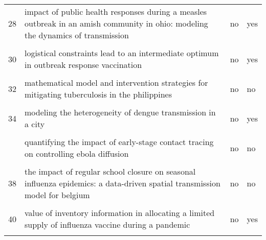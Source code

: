 \documentclass[
]{article}
\begin{document}
\begin{landscape}
\begin{longtable}{l>{\raggedright\arraybackslash}p{4cm}l>{\raggedright\arraybackslash}p{4cm}}
28 & impact of public health responses during a measles outbreak in an amish community in ohio: modeling the dynamics of transmission & no & yes\\
\cellcolor{gray!6}{29} & \cellcolor{gray!6}{initial validation of a simulation model for estimating the impact of serogroup a neisseria meningitidis vaccination in the african meningitis belt} & \cellcolor{gray!6}{no} & \cellcolor{gray!6}{yes}\\
30 & logistical constraints lead to an intermediate optimum in outbreak response vaccination & no & yes\\
\addlinespace
\cellcolor{gray!6}{31} & \cellcolor{gray!6}{manipulation of contact network structure and the impact on foot-and-mouth disease transmission} & \cellcolor{gray!6}{no} & \cellcolor{gray!6}{no}\\
32 & mathematical model and intervention strategies for mitigating tuberculosis in the philippines & no & no\\
\cellcolor{gray!6}{33} & \cellcolor{gray!6}{measles outbreak response decision-making under uncertainty: a retrospective analysis} & \cellcolor{gray!6}{no} & \cellcolor{gray!6}{yes}\\
34 & modeling the heterogeneity of dengue transmission in a city & no & yes\\
\cellcolor{gray!6}{35} & \cellcolor{gray!6}{modelling the large-scale yellow fever outbreak in luanda, angola, and the impact of vaccination} & \cellcolor{gray!6}{no} & \cellcolor{gray!6}{yes}\\
\addlinespace
36 & quantifying the impact of early-stage contact tracing on controlling ebola diffusion & no & no\\
\cellcolor{gray!6}{37} & \cellcolor{gray!6}{simulation of key interventions for seasonal influenza outbreak control at school in changsha, china} & \cellcolor{gray!6}{no} & \cellcolor{gray!6}{yes}\\
38 & the impact of regular school closure on seasonal influenza epidemics: a data-driven spatial transmission model for belgium & no & no\\
\cellcolor{gray!6}{39} & \cellcolor{gray!6}{the potential impact of case-area targeted interventions in response to cholera outbreaks: a modeling study} & \cellcolor{gray!6}{no} & \cellcolor{gray!6}{yes}\\
40 & value of inventory information in allocating a limited supply of influenza vaccine during a pandemic & no & yes\\
\addlinespace
\cellcolor{gray!6}{41} & \cellcolor{gray!6}{an age-structured model for cholera control with vaccination} & \cellcolor{gray!6}{no} & \cellcolor{gray!6}{yes}\\

\end{longtable}
\end{landscape}
\end{document}
